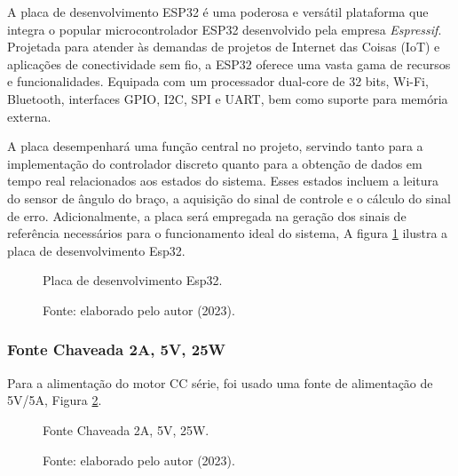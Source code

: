 A placa de desenvolvimento ESP32 é uma poderosa e versátil plataforma que integra o popular microcontrolador ESP32 desenvolvido pela empresa  \textit{Espressif}. Projetada para atender às demandas de projetos de Internet das Coisas (IoT) e aplicações de conectividade sem fio, a ESP32 oferece uma vasta gama de recursos e funcionalidades. Equipada com um processador dual-core de 32 bits, Wi-Fi, Bluetooth, interfaces GPIO, I2C, SPI e UART, bem como suporte para memória externa.

A placa desempenhará uma função central no projeto, servindo tanto para a implementação do controlador discreto quanto para a obtenção de dados em tempo real relacionados aos estados do sistema. Esses estados incluem a leitura do sensor de ângulo do braço, a aquisição do sinal de controle e o cálculo do sinal de erro. Adicionalmente, a placa será empregada na geração dos sinais de referência necessários para o funcionamento ideal do sistema, A figura \ref{fig3:image_05} ilustra a placa de desenvolvimento Esp32.

\begin{figure}[!h]
	\centering
	\caption{Placa de desenvolvimento Esp32.}
	\caption*{Fonte: elaborado pelo autor (2023).}
	\label{fig3:image_05}
\end{figure}


\subsubsection{Fonte Chaveada 2A, 5V, 25W}

Para a alimentação do motor CC série, foi usado uma fonte de alimentação de 5V/5A, Figura \ref{fig3:image_06}.

\begin{figure}[!h]
	\centering
	\caption{Fonte Chaveada 2A, 5V, 25W.}
	\caption*{Fonte: elaborado pelo autor (2023).}
	\label{fig3:image_06}
\end{figure}



